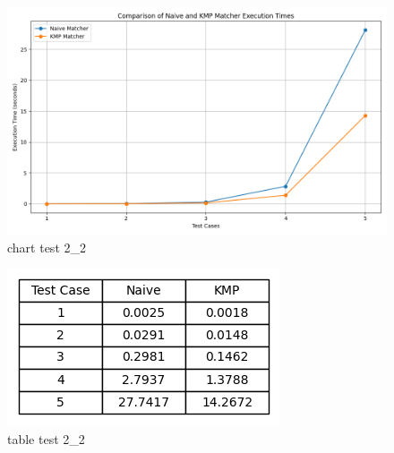 \documentclass[11pt]{article}
\begin{document}
                \begin{figure}[H]
                    \centering
                    \includegraphics[width = \textwidth]{execution_times_2_2}
                    \caption{chart test 2\_2}
                    \label{fig:chart_test_2_2}
                \end{figure}

                \begin{figure}[H]
                    \centering
                    \includegraphics[width = 0.5 \textwidth]{table_execution_times_2_2}
                    \caption{table test 2\_2}
                    \label{fig:table_test_2_2}
                \end{figure}

                \newpage

\end{document}
